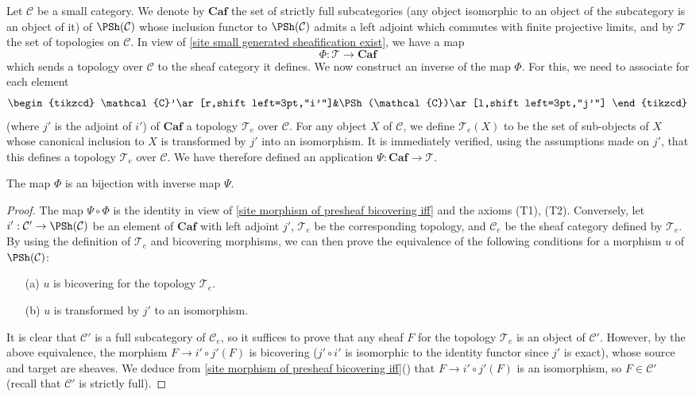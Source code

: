 Let $\mathcal{C}$ be a small category. We denote by $\mathbf{Caf}$ the set of strictly full subcategories (any object isomorphic to an object of the subcategory is an object of it) of $\PSh(\mathcal{C})$ whose inclusion functor to $\PSh(\mathcal{C})$ admits a left adjoint which commutes with finite projective limits, and by $\mathscr{T}$ the set of topologies on $\mathcal{C}$. In view of \cref{site small generated sheafification exist}, we have a map
\[\Phi:\mathscr{T}\to \mathbf{Caf}\]
which sends a topology over $\mathcal{C}$ to the sheaf category it defines. We now construct an inverse of the map $\Phi$. For this, we need to associate for each element
\[
\begin{tikzcd}
\mathcal{C}'\ar[r,shift left=3pt,"i'"]&\PSh(\mathcal{C})\ar[l,shift left=3pt,"j'"]
\end{tikzcd}
\]
(where $j'$ is the adjoint of $i'$) of $\mathbf{Caf}$ a topology $\mathcal{T}_e$ over $\mathcal{C}$. For any object $X$ of $\mathcal{C}$, we define $\mathcal{T}_e(X)$ to be the set of sub-objects of $X$ whose canonical inclusion to $X$ is transformed by $j'$ into an isomorphism. It is immediately verified, using the assumptions made on $j'$, that this defines a topology $\mathcal{T}_e$ over $\mathcal{C}$. We have therefore defined an application $\Psi:\mathbf{Caf}\to \mathscr{T}$.
\begin{theorem}\label{site topology correspond to subcategory}
The map $\Phi$ is an bijection with inverse map $\Psi$.
\end{theorem}
\begin{proof}
The map $\Psi\circ\Phi$ is the identity in view of \cref{site morphism of presheaf bicovering iff} and the axioms (T1), (T2). Conversely, let $i':\mathcal{C}'\to \PSh(\mathcal{C})$ be an element of $\mathbf{Caf}$ with left adjoint $j'$, $\mathcal{T}_e$ be the corresponding topology, and $\mathcal{C}_e$ be the sheaf category defined by $\mathcal{T}_e$. By using the definition of $\mathcal{T}_e$ and bicovering morphisms, we can then prove the equivalence of the following conditions for a morphism $u$ of $\PSh(\mathcal{C})$:
\begin{enumerate}
\item[(a)] $u$ is bicovering for the topology $\mathcal{T}_e$.
\item[(b)] $u$ is transformed by $j'$ to an isomorphism.
\end{enumerate}
It is clear that $\mathcal{C}'$ is a full subcategory of $\mathcal{C}_e$, so it suffices to prove that any sheaf $F$ for the topology $\mathcal{T}_e$ is an object of $\mathcal{C}'$. However, by the above equivalence, the morphism $F\to i'\circ j'(F)$ is bicovering ($j'\circ i'$ is isomorphic to the identity functor since $j'$ is exact), whose source and target are sheaves. We deduce from \cref{site morphism of presheaf bicovering iff}() that $F\to i'\circ j'(F)$ is an isomorphism, so $F\in\mathcal{C}'$ (recall that $\mathcal{C}'$ is strictly full).
\end{proof}

